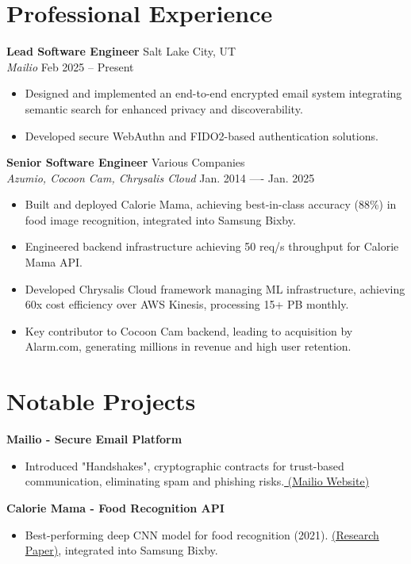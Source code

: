 \documentclass[11pt]{article}
\begin{document}
\section*{Professional Experience}
\textbf{Lead Software Engineer} \hfill Salt Lake City, UT\\
\textit{Mailio} \hfill Feb 2025 -- Present
\begin{itemize}
    \item Designed and implemented an end-to-end encrypted email system integrating semantic search for enhanced privacy and discoverability.
    \item Developed secure WebAuthn and FIDO2-based authentication solutions.
\end{itemize}

\textbf{Senior Software Engineer} \hfill Various Companies\\
\textit{Azumio, Cocoon Cam, Chrysalis Cloud} \hfill Jan. 2014 ---- Jan. 2025
\begin{itemize}
    \item Built and deployed Calorie Mama, achieving best-in-class accuracy (88\%) in food image recognition, integrated into Samsung Bixby.
    \item Engineered backend infrastructure achieving 50 req/s throughput for Calorie Mama API.
    \item Developed Chrysalis Cloud framework managing ML infrastructure, achieving 60x cost efficiency over AWS Kinesis, processing 15+ PB monthly.
    \item Key contributor to Cocoon Cam backend, leading to acquisition by Alarm.com, generating millions in revenue and high user retention.
\end{itemize}

\section*{Notable Projects}
\textbf{Mailio - Secure Email Platform}
\begin{itemize}
    \item Introduced "Handshakes", cryptographic contracts for trust-based communication, eliminating spam and phishing risks.\href{https://mail.io}{ (Mailio Website)}
\end{itemize}

\textbf{Calorie Mama - Food Recognition API}
\begin{itemize}
    \item Best-performing deep CNN model for food recognition (2021). \href{https://www.mdpi.com/2072-6643/13/11/4132?type=check_update&version=2}{(Research Paper)}, integrated into Samsung Bixby.
\end{itemize}
\end{document}
